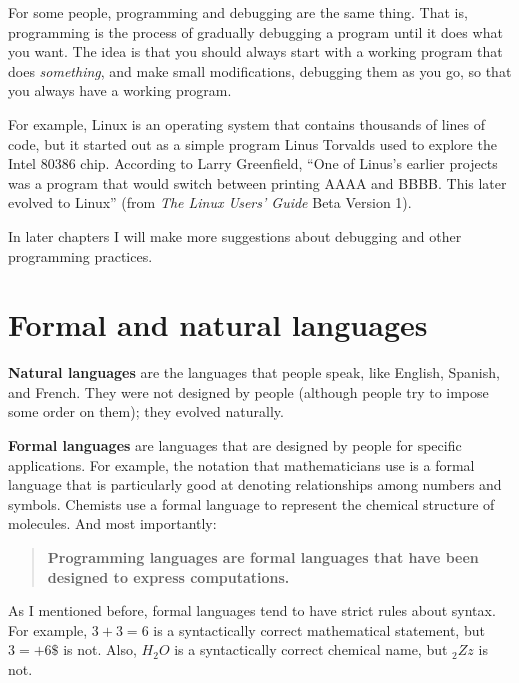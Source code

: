 
For some people, programming and debugging are the
same thing.  That is, programming is the process of gradually
debugging a program until it does what you want.  The idea
is that you should always start with a working program that
does {\em something}, and make small modifications, debugging
them as you go, so that you always have a working program.

For example, Linux is an operating system that contains thousands of
lines of code, but it started out as a simple program Linus Torvalds
used to explore the Intel 80386 chip.  According to Larry Greenfield,
``One of Linus's earlier projects was a program that would switch
between printing AAAA and BBBB.  This later evolved to Linux''
(from {\em The Linux Users' Guide} Beta Version 1).


In later chapters I will make more suggestions about debugging
and other programming practices.

\section{Formal and natural languages}
\label{formal}

{\bf Natural languages} are the languages that people speak,
like English, Spanish, and French.  They were not designed
by people (although people try to impose some order on them);
they evolved naturally.

{\bf Formal languages} are languages that are designed by people for
specific applications.  For example, the notation that mathematicians
use is a formal language that is particularly good at denoting
relationships among numbers and symbols.  Chemists use a formal
language to represent the chemical structure of molecules.  And
most importantly:

\begin{quote}
{\bf Programming languages are formal languages that have been
designed to express computations.}
\end{quote}

As I mentioned before, formal languages tend to have strict rules
about syntax.  For example, $3+3=6$ is a syntactically correct
mathematical statement, but $3=+6\$$ is not.  Also, $H_2O$ is a
syntactically correct chemical name, but $_2Zz$ is not.


